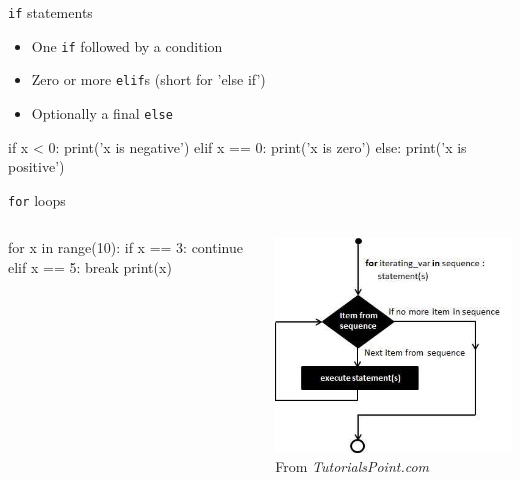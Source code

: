\begin{frame}[fragile]{\texttt{if} statements}
    \begin{itemize}
        \item One \texttt{if} followed by a condition
        \item Zero or more \texttt{elif}s (short for 'else if')
        \item Optionally a final \texttt{else}
    \end{itemize}
    \vfill
    \begin{py3}
        if x < 0:
            print('x is negative')
        elif x == 0:
            print('x is zero')
        else:
            print('x is positive')
    \end{py3}
\end{frame}

\begin{frame}[fragile]{\texttt{for} loops}
    \begin{columns}
        \begin{column}{0.5\textwidth}
            \begin{py3}
                for x in range(10):
                    if x == 3:
                        continue
                    elif x == 5:
                        break
                    print(x)
            \end{py3}
        \end{column}
        \begin{column}{0.5\textwidth}
            \begin{center}
                \includegraphics[height=0.75\textheight]{figures/for_loop} \\
                {\scriptsize%
                 From \textit{TutorialsPoint.com}}
            \end{center}
        \end{column}
    \end{columns}
\end{frame}

